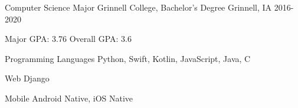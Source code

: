 \documentclass[11pt, a4paper]{awesome-cv}
\begin{document}
\begin{cventries}


\end{cventries}


\begin{cventries}
  \cventry
    {Computer Science Major}
    {Grinnell College, Bachelor's Degree}
    {Grinnell, IA}
    {2016-2020}
    {
      \begin{cvitems}
        \item {Major GPA: 3.76 \quad Overall GPA: 3.6}
      \end{cvitems}
    }
\end{cventries}


\begin{cvskills}
  \cvskill
    {Programming Languages} 
    {Python, Swift, Kotlin, JavaScript, Java, C} 

  \cvskill
    {Web}
    {Django}

  \cvskill
    {Mobile}
    {Android Native, iOS Native}

\end{cvskills}


%
%
\end{document}
